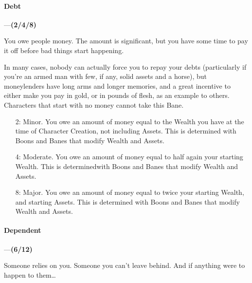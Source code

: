 \documentclass[oneside,11pt,english]{book}
\begin{document}
\paragraph{\label{bane:Debt}Debt}---\quad\textbf{(2/4/8) }\par
You owe people money. The amount is significant, but you have some time to pay it off before bad things 
start happening. 


In many cases, nobody can actually force you to repay your debts (particularly if you're an armed man 
with few, if any, solid assets and a horse), but moneylenders have long arms and longer memories, and a 
great incentive to either make you pay in gold, or in pounds of flesh, as an example to others. Characters 
that start with no money cannot take this Bane. 
\begin{itemize}
	\item [2:] Minor. You owe an amount of money equal to the Wealth you have at the time of Character Creation, not including Assets. This is determined with Boons and Banes that modify Wealth and Assets. 
	\item [4:] Moderate. You owe an amount of money equal to half again your starting Wealth. This is determinedwith Boons and Banes that modify Wealth and Assets. 
	\item [8:] Major. You owe an amount of money equal to twice your starting Wealth, and starting Assets. This is determined with Boons and Banes that modify Wealth and Assets.
\end{itemize}
\paragraph{\label{bane:Dependent}Dependent}---\quad\textbf{(6/12) }\par
Someone relies on you. Someone you can’t leave behind. And if anything were to happen to them…
\end{document}
